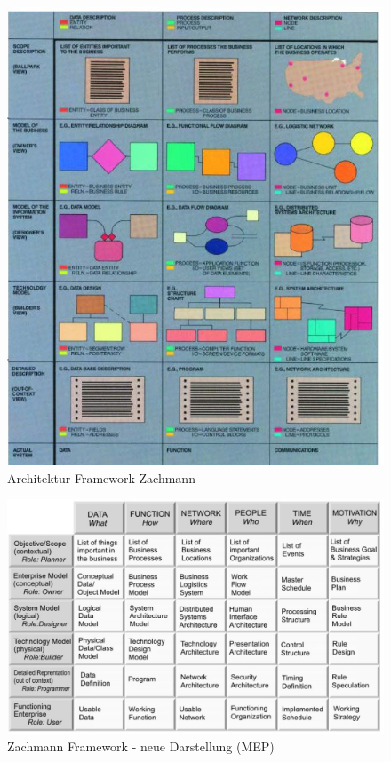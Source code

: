 \begin{figure}[h!]
\centering
\includegraphics[width=\linewidth]{fig/zachmann-model}
\caption{Architektur Framework Zachmann}
\label{fig:zachmann-model}
\end{figure}

\begin{figure}[h!]
\centering
\includegraphics[width=\linewidth]{fig/zachmann-model-neue-darstellung}
\caption{Zachmann Framework - neue Darstellung (MEP)}
\label{fig:zachmann-model-neue-darstellung}
\end{figure}

